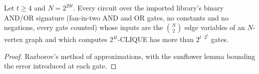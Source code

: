 \begin{theorem}
  \label{thm:lowerbounds-algebraic-clique}
  \leanok
  Let $t \ge 4$ and $N = 2^{20t}$. Every circuit over the imported library's
  binary AND/OR signature (fan-in-two AND and OR gates, no constants and no
  negations, every gate counted) whose inputs are the $\binom{N}{2}$ edge
  variables of an $N$-vertex graph and which computes $2^{4t}$-CLIQUE has more
  than $2^{t \cdot 2^t}$ gates.
\end{theorem}
\begin{proof}
  \leanok
  Razborov's method of approximations, with the sunflower lemma bounding the
  error introduced at each gate.
\end{proof}

